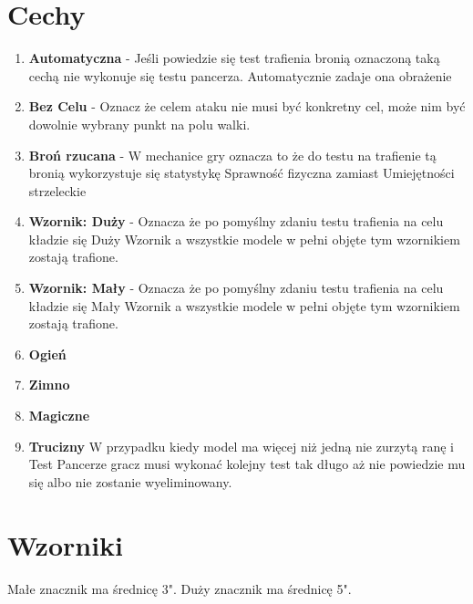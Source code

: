 \section{Cechy}
\begin{enumerate}
    \item \textbf{Automatyczna} - Jeśli powiedzie się test trafienia bronią oznaczoną taką cechą nie wykonuje się testu pancerza. Automatycznie zadaje ona obrażenie
    \item \textbf{Bez Celu} - Oznacz że celem ataku nie musi być konkretny cel, może nim być dowolnie wybrany punkt na polu walki.
    \item \textbf{Broń rzucana} - W mechanice gry oznacza to że do testu na trafienie tą bronią wykorzystuje się statystykę Sprawność fizyczna zamiast Umiejętności strzeleckie
    \item \textbf{Wzornik: Duży} - Oznacza że po pomyślny zdaniu testu trafienia na celu kładzie się Duży Wzornik a wszystkie modele w pełni objęte tym wzornikiem zostają trafione. 
    \item \textbf{Wzornik: Mały} - Oznacza że po pomyślny zdaniu testu trafienia na celu kładzie się Mały Wzornik a wszystkie modele w pełni objęte tym wzornikiem zostają trafione. 
    \item \textbf{Ogień}
    \item \textbf{Zimno}
    \item \textbf{Magiczne}
    \item \textbf{Trucizny} W przypadku kiedy model ma więcej niż jedną nie zurzytą ranę i Test Pancerze gracz musi wykonać kolejny test tak długo aż nie powiedzie mu się albo nie zostanie wyeliminowany. 
\end{enumerate}

\section{Wzorniki}
 Małe znacznik ma średnicę 3". 
 Duży znacznik ma średnicę 5".
